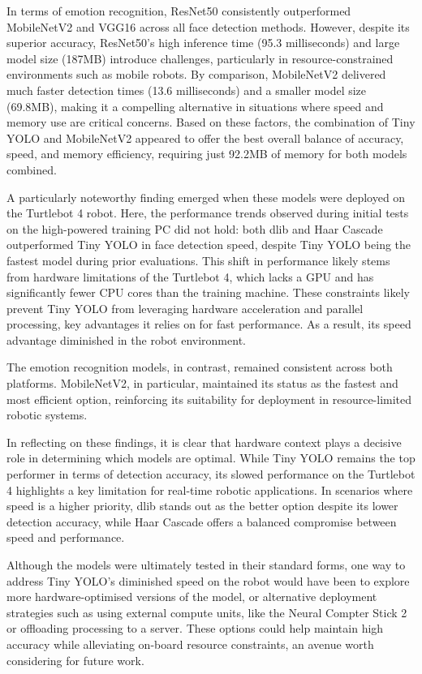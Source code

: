 In terms of emotion recognition, ResNet50 consistently outperformed MobileNetV2 and VGG16 across all face detection methods. However, despite its superior accuracy, ResNet50's high inference time (95.3 milliseconds) and large model size (187MB) introduce challenges, particularly in resource-constrained environments such as mobile robots. By comparison, MobileNetV2 delivered much faster detection times (13.6 milliseconds) and a smaller model size (69.8MB), making it a compelling alternative in situations where speed and memory use are critical concerns. Based on these factors, the combination of Tiny YOLO and MobileNetV2 appeared to offer the best overall balance of accuracy, speed, and memory efficiency, requiring just 92.2MB of memory for both models combined.

A particularly noteworthy finding emerged when these models were deployed on the Turtlebot 4 robot. Here, the performance trends observed during initial tests on the high-powered training PC did not hold: both dlib and Haar Cascade outperformed Tiny YOLO in face detection speed, despite Tiny YOLO being the fastest model during prior evaluations. This shift in performance likely stems from hardware limitations of the Turtlebot 4, which lacks a GPU and has significantly fewer CPU cores than the training machine. These constraints likely prevent Tiny YOLO from leveraging hardware acceleration and parallel processing, key advantages it relies on for fast performance. As a result, its speed advantage diminished in the robot environment.

The emotion recognition models, in contrast, remained consistent across both platforms. MobileNetV2, in particular, maintained its status as the fastest and most efficient option, reinforcing its suitability for deployment in resource-limited robotic systems.

In reflecting on these findings, it is clear that hardware context plays a decisive role in determining which models are optimal. While Tiny YOLO remains the top performer in terms of detection accuracy, its slowed performance on the Turtlebot 4 highlights a key limitation for real-time robotic applications. In scenarios where speed is a higher priority, dlib stands out as the better option despite its lower detection accuracy, while Haar Cascade offers a balanced compromise between speed and performance.

Although the models were ultimately tested in their standard forms, one way to address Tiny YOLO's diminished speed on the robot would have been to explore more hardware-optimised versions of the model, or alternative deployment strategies such as using external compute units, like the Neural Compter Stick 2 or offloading processing to a server. These options could help maintain high accuracy while alleviating on-board resource constraints, an avenue worth considering for future work.

